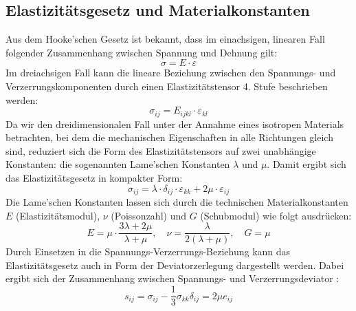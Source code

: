 \subsection{Elastizitätsgesetz und Materialkonstanten}
Aus dem Hooke’schen Gesetz ist bekannt, dass im einachsigen, linearen Fall folgender Zusammenhang zwischen Spannung und Dehnung gilt:
	\begin{equation}
		\sigma = 
		E \cdot \varepsilon
	\end{equation}
Im dreiachsigen Fall kann die lineare Beziehung zwischen den Spannungs- und Verzerrungskomponenten durch einen Elastizitätstensor 4. Stufe beschrieben werden:
	\begin{equation}
		\sigma_{ij} = 
		E_{ijkl} \cdot \varepsilon_{kl}
	\end{equation}
Da wir den dreidimensionalen Fall unter der Annahme eines isotropen Materials betrachten, bei dem die mechanischen Eigenschaften in alle Richtungen gleich sind, reduziert sich die Form des Elastizitätstensors auf zwei unabhängige Konstanten: die sogenannten Lame’schen Konstanten $\lambda$ und $\mu$. 
Damit ergibt sich das Elastizitätsgesetz in kompakter Form:
	\begin{equation}
		\sigma_{ij} = 
		\lambda \cdot \delta_{ij} \cdot \varepsilon_{kk} + 2\mu \cdot \varepsilon_{ij}
	\end{equation}
Die Lame’schen Konstanten lassen sich durch die technischen Materialkonstanten $E$ (Elastizitätsmodul), $\nu$ (Poissonzahl) und $G$ (Schubmodul) wie folgt ausdrücken:
	\begin{equation}
		E = 
		\mu \cdot \frac{3\lambda + 2\mu}{\lambda + \mu}, \quad 
		\nu = 
		\frac{\lambda}{2(\lambda + \mu)}, \quad 
		G = 
		\mu
	\end{equation}
Durch Einsetzen in die Spannungs-Verzerrungs-Beziehung kann das Elastizitätsgesetz auch in Form der Deviatorzerlegung dargestellt werden. 
Dabei ergibt sich der Zusammenhang zwischen Spannungs- und Verzerrungsdeviator \cite{elastomechanik:Grundlagen der Elastizitaetstheorie}:
	\begin{equation}
		s_{ij} = 
		\sigma_{ij} - \frac{1}{3} \sigma_{kk} \delta_{ij} = 
		2\mu e_{ij}
	\end{equation}